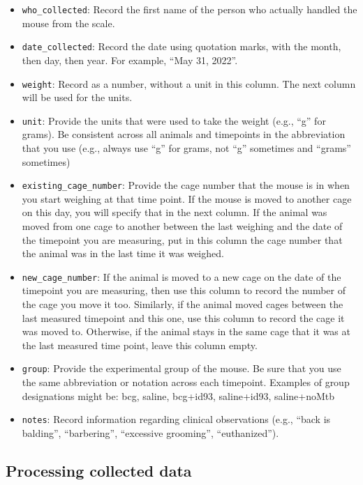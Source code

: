 \documentclass[
]{book}
\providecommand{\tightlist}{%
  \setlength{\itemsep}{0pt}\setlength{\parskip}{0pt}}
\begin{document}
\begin{itemize}
\tightlist
\item
  \texttt{who\_collected}: Record the first name of the person who actually handled the mouse from the scale.
\item
  \texttt{date\_collected}: Record the date using quotation marks, with the month, then day, then year. For example, ``May 31, 2022''.
\item
  \texttt{weight}: Record as a number, without a unit in this column. The next column will be used for the units.\\
\item
  \texttt{unit}: Provide the units that were used to take the weight (e.g., ``g'' for grams). Be consistent across all animals and timepoints in the abbreviation that you use (e.g., always use ``g'' for grams, not ``g'' sometimes and ``grams'' sometimes)
\item
  \texttt{existing\_cage\_number}: Provide the cage number that the mouse is in when you start weighing at that time point. If the mouse is moved to another cage on this day, you will specify that in the next column. If the animal was moved from one cage to another between the last weighing and the date of the timepoint you are measuring, put in this column the cage number that the animal was in the last time it was weighed.
\item
  \texttt{new\_cage\_number}: If the animal is moved to a new cage on the date of the timepoint you are measuring, then use this column to record the number of the cage you move it too. Similarly, if the animal moved cages between the last measured timepoint and this one, use this column to record the cage it was moved to. Otherwise, if the animal stays in the same cage that it was at the last measured time point, leave this column empty.
\item
  \texttt{group}: Provide the experimental group of the mouse. Be sure that you use the same abbreviation or notation across each timepoint. Examples of group designations might be: bcg, saline, bcg+id93, saline+id93, saline+noMtb
\item
  \texttt{notes}: Record information regarding clinical observations (e.g., ``back is balding'', ``barbering'', ``excessive grooming'', ``euthanized'').
\end{itemize}

\hypertarget{processing-collected-data}{%
\subsection{Processing collected data}\label{processing-collected-data}}
\end{document}
